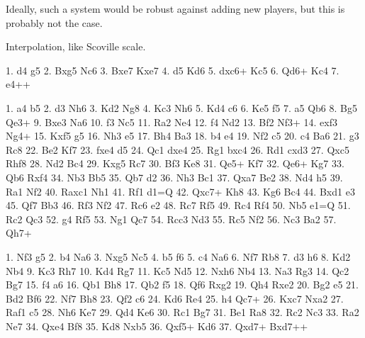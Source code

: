 \documentclass[numbers]{sigplanconf}
\begin{document}
Ideally, such a system would be robust against adding new players,
but this is probably not the case.

% 

Interpolation, like Scoville scale.

1. d4 g5 2. Bxg5 Nc6 3. Bxe7 Kxe7 4. d5 Kd6
5. dxc6+ Kc5 6. Qd6+ Kc4 7. e4++

1. a4 b5 2. d3 Nh6 3. Kd2 Ng8 4. Kc3 Nh6
5. Kd4 c6 6. Ke5 f5 7. a5 Qb6 8. Bg5 Qe3+
9. Bxe3 Na6 10. f3 Nc5 11. Ra2 Ne4 12. f4 Nd2
13. Bf2 Nf3+ 14. exf3 Ng4+ 15. Kxf5 g5 16. Nh3 e5
17. Bh4 Ba3 18. b4 e4 19. Nf2 c5 20. c4 Ba6
21. g3 Rc8 22. Be2 Kf7 23. fxe4 d5 24. Qc1 dxe4
25. Rg1 bxc4 26. Rd1 cxd3 27. Qxc5 Rhf8 28. Nd2 Bc4
29. Kxg5 Rc7 30. Bf3 Ke8 31. Qe5+ Kf7 32. Qe6+ Kg7
33. Qb6 Rxf4 34. Nb3 Bb5 35. Qb7 d2 36. Nh3 Bc1
37. Qxa7 Be2 38. Nd4 h5 39. Ra1 Nf2 40. Raxc1 Nh1
41. Rf1 d1=Q 42. Qxc7+ Kh8 43. Kg6 Bc4 44. Bxd1 e3
45. Qf7 Bb3 46. Rf3 Nf2 47. Rc6 e2 48. Rc7 Rf5
49. Rc4 Rf4 50. Nb5 e1=Q 51. Rc2 Qc3 52. g4 Rf5
53. Ng1 Qc7 54. Rcc3 Nd3 55. Rc5 Nf2 56. Nc3 Ba2
57. Qh7+

1. Nf3 g5 2. b4 Na6 3. Nxg5 Nc5 4. b5 f6
5. c4 Na6 6. Nf7 Rb8 7. d3 h6 8. Kd2 Nb4
9. Kc3 Rh7 10. Kd4 Rg7 11. Kc5 Nd5 12. Nxh6 Nb4
13. Na3 Rg3 14. Qc2 Bg7 15. f4 a6 16. Qb1 Bh8
17. Qb2 f5 18. Qf6 Rxg2 19. Qh4 Rxe2 20. Bg2 e5
21. Bd2 Bf6 22. Nf7 Bh8 23. Qf2 c6 24. Kd6 Re4
25. h4 Qc7+ 26. Kxc7 Nxa2 27. Raf1 c5 28. Nh6 Ke7
29. Qd4 Ke6 30. Rc1 Bg7 31. Be1 Ra8 32. Rc2 Nc3
33. Ra2 Ne7 34. Qxe4 Bf8 35. Kd8 Nxb5 36. Qxf5+ Kd6
37. Qxd7+ Bxd7++




\end{document}
